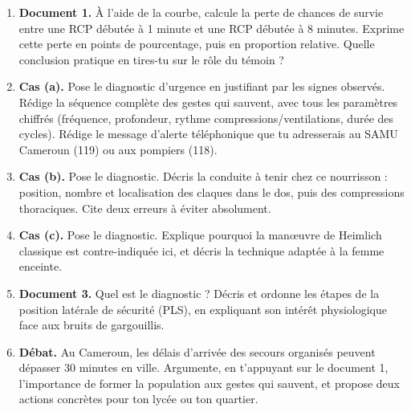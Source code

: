 \documentclass[11pt]{article}
\newcounter{popsec}
\newcounter{popsub}
\newcommand{\courssub}[1]{%
  \stepcounter{popsub}%
  \par\vspace{9pt}\noindent{\popxbold\fontsize{11.5}{13}\selectfont\color{popink}{\color{poporange}\thepopsec.\thepopsub}\hspace{6pt}#1}\par\nopagebreak\vspace{4pt}
}
\begin{document}
\begin{enumerate}
\item \textbf{Document 1.} À l'aide de la courbe, calcule la perte de chances de survie entre une RCP débutée à 1 minute et une RCP débutée à 8 minutes. Exprime cette perte en points de pourcentage, puis en proportion relative. Quelle conclusion pratique en tires-tu sur le rôle du témoin ?
\item \textbf{Cas (a).} Pose le diagnostic d'urgence en justifiant par les signes observés. Rédige la séquence complète des gestes qui sauvent, avec tous les paramètres chiffrés (fréquence, profondeur, rythme compressions/ventilations, durée des cycles). Rédige le message d'alerte téléphonique que tu adresserais au SAMU Cameroun (119) ou aux pompiers (118).
\item \textbf{Cas (b).} Pose le diagnostic. Décris la conduite à tenir chez ce nourrisson : position, nombre et localisation des claques dans le dos, puis des compressions thoraciques. Cite deux erreurs à éviter absolument.
\item \textbf{Cas (c).} Pose le diagnostic. Explique pourquoi la manœuvre de Heimlich classique est contre-indiquée ici, et décris la technique adaptée à la femme enceinte.
\item \textbf{Document 3.} Quel est le diagnostic ? Décris et ordonne les étapes de la position latérale de sécurité (PLS), en expliquant son intérêt physiologique face aux bruits de gargouillis.
\item \textbf{Débat.} Au Cameroun, les délais d'arrivée des secours organisés peuvent dépasser 30 minutes en ville. Argumente, en t'appuyant sur le document 1, l'importance de former la population aux gestes qui sauvent, et propose deux actions concrètes pour ton lycée ou ton quartier.
\end{enumerate}

\courssub{Ressources à mobiliser}
\end{document}
